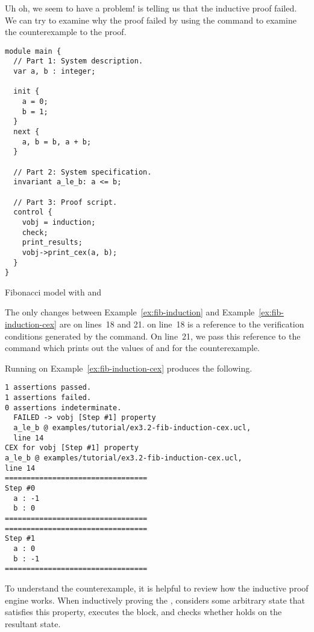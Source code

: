 Uh oh, we seem to have a problem! \uclid{} is telling us that the inductive proof failed. We can try to examine why the proof failed by using the  command to examine the counterexample to the proof.


\begin{uclidlisting}[htbp]
\begin{lstlisting}[language=uclid,style=uclidstyle]
module main {
  // Part 1: System description.
  var a, b : integer;

  init {
    a = 0;
    b = 1;
  }
  next {
    a, b = b, a + b;
  }

  // Part 2: System specification.
  invariant a_le_b: a <= b;

  // Part 3: Proof script.
  control {
    vobj = induction;
    check;
    print_results;
    vobj->print_cex(a, b);
  }
}
\end{lstlisting}
\caption{\uclid{} Fibonacci model with  and }
\label{ex:fib-induction-cex}
\end{uclidlisting}

The only changes between Example~\ref{ex:fib-induction} and Example~\ref{ex:fib-induction-cex} are on lines~18 and 21.  on line~18 is a reference to the verification conditions generated by the  command. On line~21, we pass this reference to the  command which prints out the values of  and  for the counterexample.

Running \uclid{} on Example~\ref{ex:fib-induction-cex} produces the following.

\begin{Verbatim}[frame=single, samepage=true]
1 assertions passed.
1 assertions failed.
0 assertions indeterminate.
  FAILED -> vobj [Step #1] property 
  a_le_b @ examples/tutorial/ex3.2-fib-induction-cex.ucl, 
  line 14
CEX for vobj [Step #1] property 
a_le_b @ examples/tutorial/ex3.2-fib-induction-cex.ucl, 
line 14
=================================
Step #0
  a : -1
  b : 0
=================================
=================================
Step #1
  a : 0
  b : -1
=================================
\end{Verbatim}

To understand the counterexample, it is helpful to review how the inductive proof engine works. When inductively proving the  , \uclid{} considers some arbitrary state that satisfies this property, executes the  block, and checks whether  holds on the resultant state.

